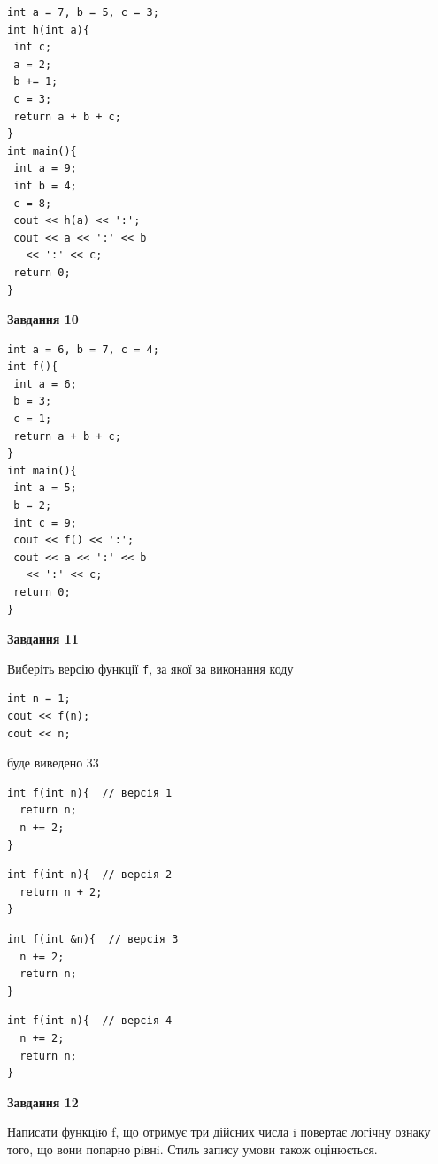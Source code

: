 \documentclass[12pt, ukrainian]{article}
\def\code#1{\Verb!#1!}
\begin{document}
{\begin {large}
\begin{minipage}[t]{7.0cm}
\begin{verbatim}
int a = 7, b = 5, c = 3;
int h(int a){
 int c;
 a = 2;
 b += 1;
 c = 3;
 return a + b + c;
}
int main(){
 int a = 9;
 int b = 4;
 c = 8;
 cout << h(a) << ':';
 cout << a << ':' << b 
   << ':' << c;
 return 0;
}
\end{verbatim}



\begin{center}
\textbf{Завдання 10}
\end{center}
\vspace{-8mm}

\begin{verbatim}
int a = 6, b = 7, c = 4;
int f(){
 int a = 6;
 b = 3;
 c = 1;
 return a + b + c;
}
int main(){
 int a = 5;
 b = 2;
 int c = 9;
 cout << f() << ':';
 cout << a << ':' << b 
   << ':' << c;
 return 0;
}
\end{verbatim}

\end{minipage}
\vline \hspace{1mm}
\begin{minipage}[t]{11.0cm}

\begin{center}
\textbf{Завдання 11}
\end{center}
Виберіть версію функції \code{f}, за якої за виконання коду
\begin{verbatim}
int n = 1;
cout << f(n);
cout << n;
\end{verbatim}

буде виведено 33

\begin{verbatim}
int f(int n){  // версія 1
  return n;
  n += 2;
}
\end{verbatim}

\vspace{-8mm}\begin{verbatim}
int f(int n){  // версія 2
  return n + 2;
}
\end{verbatim}

\vspace{-8mm}\begin{verbatim}
int f(int &n){  // версія 3
  n += 2;
  return n;
}
\end{verbatim}

\vspace{-8mm}\begin{verbatim}
int f(int n){  // версія 4
  n += 2;
  return n;
}
\end{verbatim}



\begin{center}
\textbf{Завдання 12}
\end{center}

Написати функцiю f, що отримує три дійсних числа i повертає логічну ознаку того, що вони попарно рiвнi. Стиль запису умови також оцінюється.\par

\end{minipage}

\end {large}}
\newpage
\end{document}
